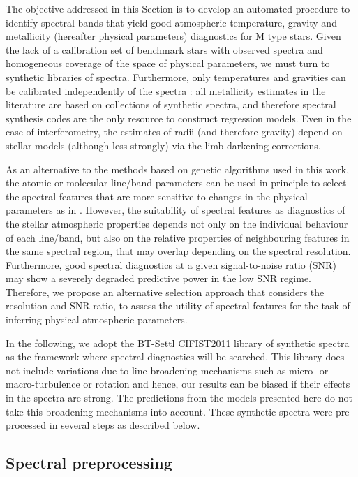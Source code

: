 The objective addressed in this Section is to develop an automated
procedure to identify spectral bands that yield good atmospheric
temperature, gravity and metallicity (hereafter physical parameters)
diagnostics for M type stars. Given the lack of a calibration set of
benchmark stars with observed spectra and homogeneous coverage of the
space of physical parameters, we must turn to synthetic libraries of
spectra. Furthermore, only temperatures and gravities can be
calibrated independently of the spectra \citep[for example as
in][using interferometry]{2003A&A...397L...5S}: all metallicity
estimates in the literature are based on collections of synthetic
spectra, and therefore spectral synthesis codes are the only resource
to construct regression models. Even in the case of interferometry,
the estimates of radii (and therefore gravity) depend on stellar
models (although less strongly) via the limb darkening corrections.

As an alternative to the methods based on genetic algorithms used in
this work, the atomic or molecular line/band parameters can be used in
principle to select the spectral features that are more sensitive to
changes in the physical parameters as
in \cite{2016A&A...587A..19P}. However, the suitability of spectral
features as diagnostics of the stellar atmospheric properties depends
not only on the individual behaviour of each line/band, but also on
the relative properties of neighbouring features in the same spectral
region, that may overlap depending on the spectral
resolution. Furthermore, good spectral diagnostics at a given
signal-to-noise ratio (SNR) may show a severely degraded predictive
power in the low SNR regime. Therefore, we propose an alternative
selection approach that considers the resolution and SNR ratio, 
to assess the utility of spectral features for the task of
inferring physical atmospheric parameters. 

In the following, we adopt the BT-Settl CIFIST2011 library of
synthetic spectra
\citep{2013MSAIS..24..128A} as the framework where spectral
diagnostics will be searched. This library does not include variations
due to line broadening mechanisms such as micro- or macro-turbulence
or rotation and hence, our results can be biased if their effects in
the spectra are strong. The predictions from the models presented here
do not take this broadening mechanisms into account. These synthetic
spectra were pre-processed in several steps as described below.

\subsection{Spectral preprocessing}

